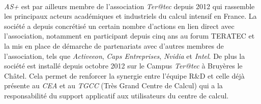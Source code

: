 \paragraph{}
\emph{AS+} est par ailleurs membre de l’association \emph{Ter@tec} depuis 2012 qui rassemble les principaux acteurs académiques et industriels du calcul intensif en France. La société a depuis concrétisé un certain nombre d’actions en lien direct avec l’association, notamment en participant depuis cinq ans au forum TERATEC et la mis en place de démarche de partenariats avec d’autres membres de l’association, tels que \emph{Activeeon}, \emph{Caps Entreprises}, \emph{Nvidia} et \emph{Intel}. De plus la société est installé depuis octobre 2012 sur le Campus \emph{Ter@tec} à Bruyères le Châtel. Cela permet de renforcer la synergie entre l'équipe R\&D et celle déjà présente au \emph{CEA} et au \emph{TGCC} (Très Grand Centre de Calcul) qui a la responsabilité du support applicatif aux utilisateurs du centre de calcul.
